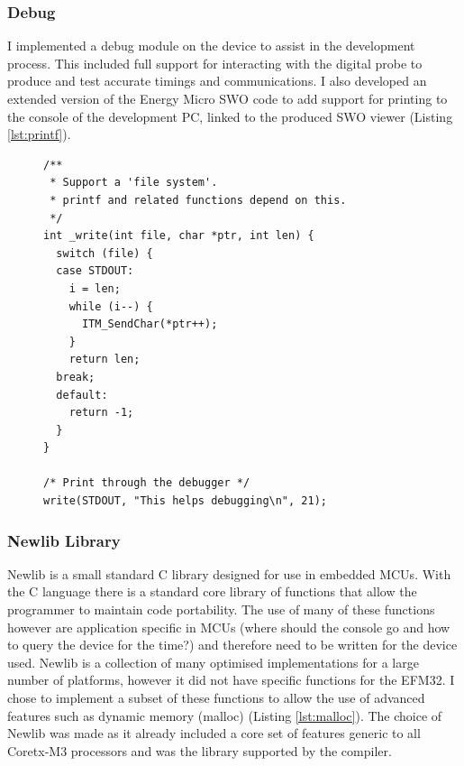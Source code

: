 \subsubsection{Debug}
I implemented a debug module on the device to assist in the development process. This included full
support for interacting with the digital probe to produce and test accurate timings and
communications. I also developed an extended version of the Energy Micro \ac{SWO} code to add
support for printing to the console of the development PC, linked to the produced \ac{SWO} viewer (Listing \ref{lst:printf}).

\begin{figure}
  \vspace{-10pt}
  \begin{center}
    \begin{lstlisting}
/**
 * Support a 'file system'.
 * printf and related functions depend on this.
 */
int _write(int file, char *ptr, int len) {
  switch (file) {
  case STDOUT:
    i = len;
    while (i--) {
      ITM_SendChar(*ptr++);
    }
    return len;
  break;
  default:
    return -1;
  }
}

/* Print through the debugger */
write(STDOUT, "This helps debugging\n", 21);
    \end{lstlisting}
  \end{center}
  \vspace{-10pt}
\end{figure}

\subsubsection{Newlib Library}
Newlib is a small standard C library designed for use in embedded \acp{MCU}. With the C language there
is a standard core library of functions that allow the programmer to maintain code portability. The
use of many of these functions however are application specific in \acp{MCU} (\eg where should the
console go and how to query the device for the time?) and therefore need to be written for the
device used. Newlib is a collection of many optimised implementations for a large number of
platforms, however it did not have specific functions for the EFM32. I chose to implement a subset
of these functions to allow the use of advanced features such as dynamic memory (\ie malloc) (Listing \ref{lst:malloc}). The
choice of Newlib was made as it already included a core set of features generic to all Coretx-M3
processors and was the library supported by the compiler.

